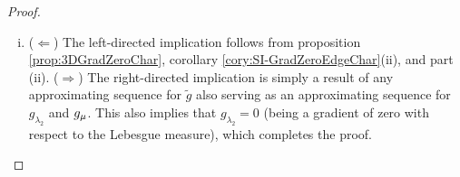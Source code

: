 \begin{proof}
\begin{enumerate}[(i)]
		\item ($\Leftarrow$) The left-directed implication follows from proposition \ref{prop:3DGradZeroChar}, corollary \ref{cory:SI-GradZeroEdgeChar}(ii), and part (ii). \newline
	($\Rightarrow$) The right-directed implication is simply a result of any approximating sequence for $\tilde{g}$ also serving as an approximating sequence for $g_{\lambda_2}$ and $g_{\mu}$.
	This also implies that $g_{\lambda_2} = 0$ (being a gradient of zero with respect to the Lebesgue measure), which completes the proof.
	\end{enumerate}
\end{proof}

